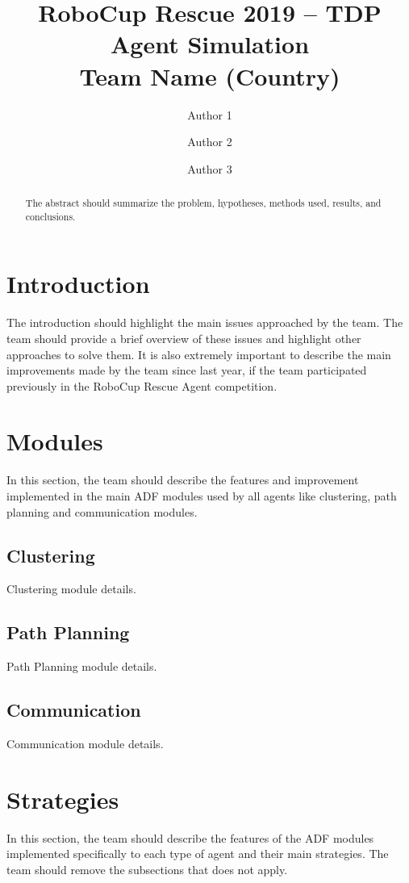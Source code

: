 \documentclass[runningheads,a4paper]{llncs}
\begin{document}
\title{RoboCup Rescue 2019 -- TDP Agent Simulation\\
       Team Name (Country)}
\author{Author 1 \and Author 2 \and Author 3}
\maketitle
\begin{abstract}
The abstract should summarize the problem, hypotheses, methods used, results, and conclusions.
\end{abstract}
\section{Introduction}
The introduction should highlight the main issues approached by the team. The
team should provide a brief overview of these issues and highlight other
approaches to solve them. It is also extremely important to describe the main
improvements made by the team since last year, if the team participated
previously in the RoboCup Rescue Agent competition.
\section{Modules}
In this section, the team should describe the features and improvement
implemented in the main ADF modules used by all agents like clustering, path
planning and communication modules.
\subsection{Clustering}
Clustering module details.
\subsection{Path Planning}
Path Planning module details.
\subsection{Communication}
Communication module details.
\section{Strategies}
In this section, the team should describe the features of the ADF modules
implemented specifically to each type of agent and their main strategies. The
team should remove the subsections that does not apply.
\end{document}
